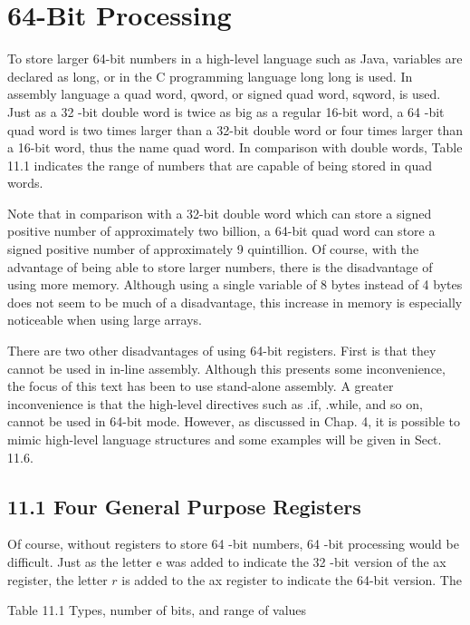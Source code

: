 \documentclass[10pt]{book}
\begin{document}
\section*{64-Bit Processing}
To store larger 64-bit numbers in a high-level language such as Java, variables are declared as long, or in the C programming language long long is used. In assembly language a quad word, qword, or signed quad word, sqword, is used. Just as a 32 -bit double word is twice as big as a regular 16-bit word, a 64 -bit quad word is two times larger than a 32-bit double word or four times larger than a 16-bit word, thus the name quad word. In comparison with double words, Table 11.1 indicates the range of numbers that are capable of being stored in quad words.


Note that in comparison with a 32-bit double word which can store a signed positive number of approximately two billion, a 64-bit quad word can store a signed positive number of approximately 9 quintillion. Of course, with the advantage of being able to store larger numbers, there is the disadvantage of using more memory. Although using a single variable of 8 bytes instead of 4 bytes does not seem to be much of a disadvantage, this increase in memory is especially noticeable when using large arrays.

There are two other disadvantages of using 64-bit registers. First is that they cannot be used in in-line assembly. Although this presents some inconvenience, the focus of this text has been to use stand-alone assembly. A greater inconvenience is that the high-level directives such as .if, .while, and so on, cannot be used in 64-bit mode. However, as discussed in Chap. 4, it is possible to mimic high-level language structures and some examples will be given in Sect. 11.6.

\subsection*{11.1 Four General Purpose Registers}
Of course, without registers to store 64 -bit numbers, 64 -bit processing would be difficult. Just as the letter e was added to indicate the 32 -bit version of the ax register, the letter $r$ is added to the ax register to indicate the 64-bit version. The

Table 11.1 Types, number of bits, and range of values
\end{document}
